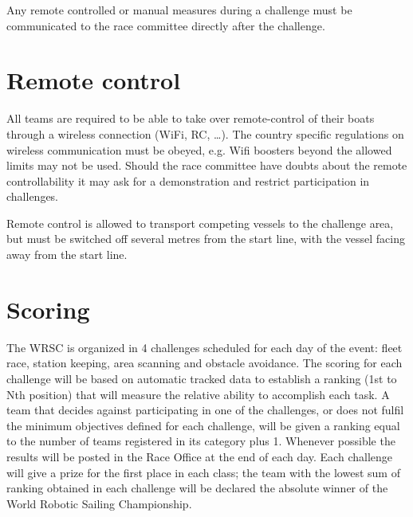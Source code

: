 \documentclass[12pt]{article}
\begin{document}
Any remote controlled or manual measures during a challenge must be
communicated to the race committee directly after the challenge.

\section{Remote control}
All teams are required to be able to take over remote-control of their boats
through a wireless connection (WiFi, RC, \ldots). The country specific 
regulations on wireless communication must be obeyed, e.g. Wifi boosters beyond
the allowed limits may not be used.
Should the race committee have doubts about the remote controllability it may
ask for a demonstration and restrict participation in challenges.

Remote control is allowed to transport competing vessels to the challenge area,
but must be switched off several metres from the start line, with the vessel
facing away from the start line.


\section{Scoring}
The WRSC is organized in 4 challenges scheduled for each day of the event: fleet
race, station keeping, area scanning and obstacle avoidance. The scoring for each 
challenge will be based on automatic tracked data to establish a ranking 
(1st to Nth position) that will measure the relative
ability to accomplish each task. A team that decides against participating in
one of the challenges, or does not fulfil the minimum objectives defined for
each challenge, will be given a ranking equal to the number of teams registered 
in its category plus 1. Whenever possible
the results will be posted in the Race Office at the end of each day.
Each challenge will give a prize for the first place in each class; the team
with the lowest sum of ranking obtained in each challenge will be declared the
absolute winner of the World Robotic Sailing Championship.
\end{document}
